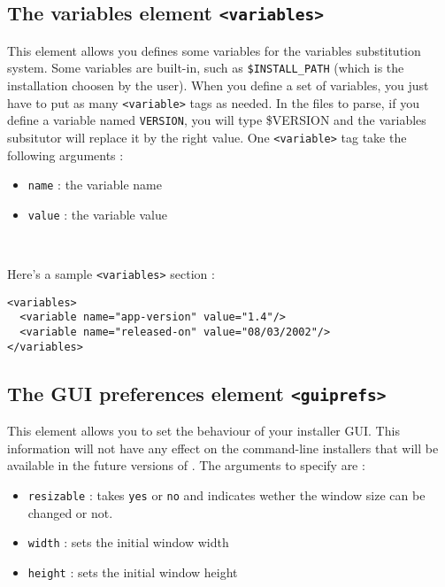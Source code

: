 \subsection{The variables element \texttt{<variables>}}

This element allows you defines some variables for the variables substitution
system. Some variables are built-in, such as \texttt{\$INSTALL\_PATH} (which is
the installation choosen by the user). When you define a set of variables, you
just have to put as many \texttt{<variable>} tags as needed. In the files to
parse, if you define a variable named \texttt{VERSION}, you will type \$VERSION
and the variables subsitutor will replace it by the right value.
One \texttt{<variable>} tag take the following arguments :
\begin{itemize}

  \item \texttt{name} : the variable name
  \item \texttt{value} : the variable value

\end{itemize}\

Here's a sample \texttt{<variables>} section :\\
\footnotesize
\begin{verbatim}
<variables>
  <variable name="app-version" value="1.4"/>
  <variable name="released-on" value="08/03/2002"/>
</variables>
\end{verbatim}
\normalsize

\subsection{The GUI preferences element \texttt{<guiprefs>}}

This element allows you to set the behaviour of your installer GUI. This
information will not have any effect on the command-line installers that will be
available in the future versions of \IzPack. The arguments to specify are :
\begin{itemize}

  \item \texttt{resizable} : takes \texttt{yes} or \texttt{no} and indicates
  wether the window size can be changed or not.
  \item \texttt{width} : sets the initial window width
  \item \texttt{height} : sets the initial window height
  
\end{itemize}\

